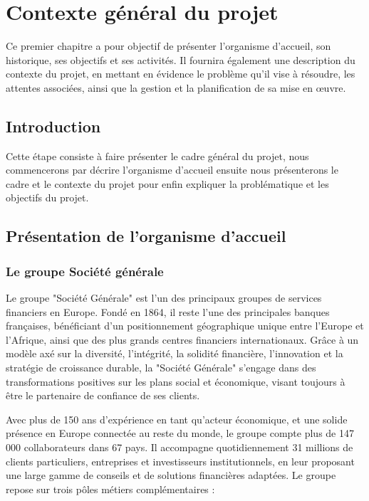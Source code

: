 \chapter{Contexte général du projet}
Ce premier chapitre a pour objectif de présenter l'organisme d'accueil, son historique, ses objectifs et ses activités. Il fournira également une description du contexte du projet, en mettant en évidence le problème qu'il vise à résoudre, les attentes associées, ainsi que la gestion et la planification de sa mise en œuvre.

\clearpage

\section{Introduction}
Cette étape consiste à faire présenter le cadre général du projet, nous commencerons par décrire l’organisme d’accueil ensuite nous présenterons le cadre et le contexte du projet pour enfin expliquer la problématique et les objectifs du projet. 


\section{Présentation de l’organisme d’accueil}
\label{sec:hotspot}
\subsection{Le groupe Société générale}
Le groupe "Société Générale" est l'un des principaux groupes de services financiers en Europe. Fondé en 1864, il reste l'une des principales banques françaises, bénéficiant d'un positionnement géographique unique entre l'Europe et l'Afrique, ainsi que des plus grands centres financiers internationaux. Grâce à un modèle axé sur la diversité, l'intégrité, la solidité financière, l'innovation et la stratégie de croissance durable, la "Société Générale" s'engage dans des transformations positives sur les plans social et économique, visant toujours à être le partenaire de confiance de ses clients. 

\medskip

Avec plus de 150 ans d'expérience en tant qu'acteur économique, et une solide présence en Europe connectée au reste du monde, le groupe compte plus de 147 000 collaborateurs dans 67 pays. Il accompagne quotidiennement 31 millions de clients particuliers, entreprises et investisseurs institutionnels, en leur proposant une large gamme de conseils et de solutions financières adaptées. Le groupe repose sur trois pôles métiers complémentaires :


